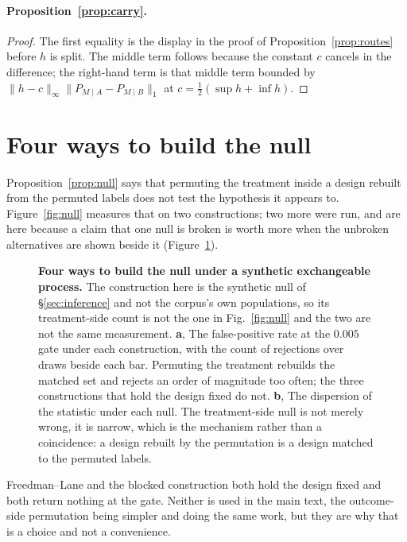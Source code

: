 \documentclass[11pt]{article}
\begin{document}
\paragraph{Proposition~\ref{prop:carry}.}
\begin{proof}
The first equality is the display in the proof of Proposition~\ref{prop:routes} before $h$ is
split. The middle term follows because the constant $c$ cancels in the difference; the right-hand
term is that middle term bounded by $\|h-c\|_\infty\|P_{M\mid A}-P_{M\mid B}\|_1$ at
$c=\tfrac12(\sup h+\inf h)$.
\end{proof}

\section{Four ways to build the null}
\label{app:nulls}

Proposition~\ref{prop:null} says that permuting the treatment inside a design rebuilt from the
permuted labels does not test the hypothesis it appears to. Figure~\ref{fig:null} measures that on
two constructions; two more were run, and are here because a claim that one null is broken is worth
more when the unbroken alternatives are shown beside it (Figure~\ref{fig:nulls}).

\begin{figure}[!htbp]
\centering

\caption{\textbf{Four ways to build the null under a synthetic exchangeable process.} The
construction here is the synthetic null of \S\ref{sec:inference} and not the corpus's own
populations, so its treatment-side count is not the one in Fig.~\ref{fig:null} and the two are not
the same measurement. \textbf{a}, The false-positive rate at the $0.005$ gate under each
construction, with the count of rejections over draws beside each bar. Permuting the treatment
rebuilds the matched set and rejects an order of magnitude too often; the three constructions that
hold the design fixed do not. \textbf{b}, The dispersion of the statistic under each null. The
treatment-side null is not merely wrong, it is narrow, which is the mechanism rather than a
coincidence: a design rebuilt by the permutation is a design matched to the permuted labels.}
\label{fig:nulls}
\end{figure}

Freedman--Lane and the blocked construction both hold the design fixed and both return nothing at
the gate. Neither is used in the main text, the outcome-side permutation being simpler and doing
the same work, but they are why that is a choice and not a convenience.
\end{document}
